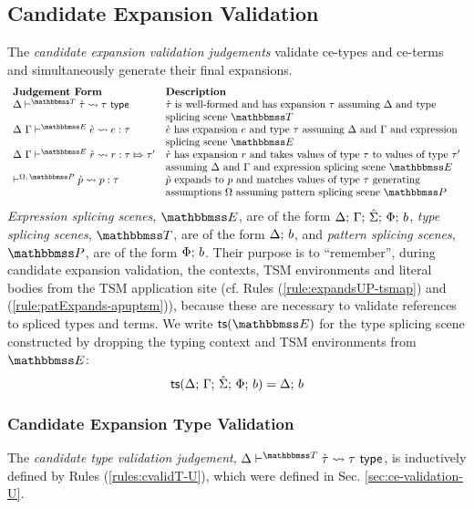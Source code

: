 {{{{\subsection{Candidate Expansion Validation}\label{sec:ce-validation-UP}
The \emph{candidate expansion validation judgements} validate ce-types and ce-terms and simultaneously generate their final expansions.
\[\begin{array}{ll}
\textbf{Judgement Form} & \textbf{Description}\\
\cvalidT{\Delta}{\tscenev}{\ctau}{\tau} & \text{$\ctau$ is well-formed and has expansion $\tau$ assuming $\Delta$ and type}\\
& \text{splicing scene $\tscenev$}\\
\cvalidE{\Delta}{\Gamma}{\escenev}{\ce}{e}{\tau} & \text{$\ce$ has expansion $e$ and type $\tau$ assuming $\Delta$ and $\Gamma$ and expression}\\
& \text{splicing scene $\escenev$}\\
\cvalidR{\Delta}{\Gamma}{\escenev}{\crv}{r}{\tau}{\tau'} & \text{$\crv$ has expansion $r$ and takes values of type $\tau$ to values of type $\tau'$}\\
& \text{assuming $\Delta$ and $\Gamma$ and expression splicing scene $\escenev$}\\
\cvalidP{\pctx}{\pscenev}{\cpv}{p}{\tau} & \text{$\cpv$ expands to $p$ and matches values of type $\tau$ generating}\\
& \text{assumptions $\pctx$ assuming pattern splicing scene $\pscenev$}
\end{array}\]
\emph{Expression splicing scenes}, $\escenev$, are of the form $\Delta;\,\Gamma;\,\hat{\Sigma};\,\Phi;\,b$, \emph{type splicing scenes}, $\tscenev$, are of the form $\Delta;\,b$, and \emph{pattern splicing scenes}, $\pscenev$, are of the form $\Phi;\,b$. Their purpose is to ``remember'', during candidate expansion validation, the contexts, TSM environments and literal bodies from the TSM application site (cf. Rules (\ref{rule:expandsUP-tsmap}) and (\ref{rule:patExpands-apuptsm})), because these are necessary to validate references to spliced types and terms. We write $\tsfrom{\escenev}$ for the type splicing scene constructed by dropping the typing context and TSM environments from $\escenev$:
\[\mathsf{ts}(\Delta;\,\Gamma;\,\hat{\Sigma};\,\Phi;\,b) = \Delta;\,b\]

\subsubsection{Candidate Expansion Type Validation}
The \emph{candidate type validation judgement}, $\cvalidT{\Delta}{\tscenev}{\ctau}{\tau}$, is inductively defined by Rules (\ref{rules:cvalidT-U}), which were defined in Sec. \ref{sec:ce-validation-U}.

}}}}
